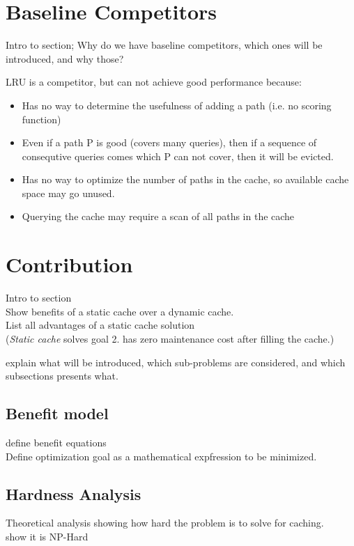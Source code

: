 \section{Baseline Competitors}

Intro to section; Why do we have baseline competitors, which ones will be introduced, and why those? 

LRU is a competitor, but can not achieve good performance because:
\begin{itemize}	
	\item Has no way to determine the usefulness of adding a path (i.e. no scoring function)
	\item Even if a path P is good (covers many queries), then if a sequence of consequtive queries comes which P can not cover, then it will be evicted.
	\item Has no way to optimize the number of paths in the cache, so available cache space may go unused.
	\item Querying the cache may require a scan of all paths in the cache
\end{itemize}

\section{Contribution} \label{sec:contribution}

Intro to section \\
Show benefits of a static cache over a dynamic cache.\\
List all advantages of a static cache solution \\
(\textit{Static cache} solves goal 2. has zero maintenance cost after filling the cache.)

explain what will be introduced, which sub-problems are considered, and which subsections presents what.


\subsection{Benefit model}
define benefit equations\\
Define optimization goal as a mathematical expfression to be minimized.

\subsection{Hardness Analysis}
Theoretical analysis showing how hard the problem is to solve for \spath caching.\\
show it is NP-Hard
 

